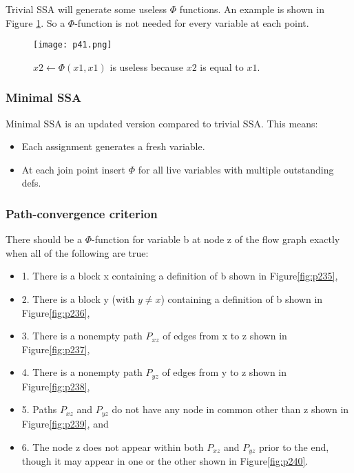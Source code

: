 Trivial SSA will generate some useless $\Phi$ functions. An example is shown in Figure \ref{fig:p41}. 
So a $\Phi$-function is not needed for every variable at each point.

\begin{figure}[H]
	\centering
	\texttt{[image: p41.png]}
	\caption{$x2 \leftarrow \Phi(x1,x1)$ is useless because $x2$ is equal to $x1$.}
	\label{fig:p41}

\end{figure}



\subsubsection{Minimal SSA}
Minimal SSA is an updated version compared to trivial SSA. This means:

\begin{itemize}
	\item Each assignment generates a fresh variable.
	\item At each join point insert $\Phi$ for all live variables with multiple outstanding defs.
\end{itemize}

\subsubsection{Path-convergence criterion}

There should be a $\Phi$-function for variable b at node z of the flow graph
exactly when all of the following are true:

\begin{itemize}
	\item 1. There is a block x containing a definition of b shown in Figure\ref{fig:p235},
	\item 2. There is a block y (with $y \neq x$) containing a definition of b shown in Figure\ref{fig:p236},
	\item 3. There is a nonempty path $P_{xz}$ of edges from x to z shown in Figure\ref{fig:p237},
	\item 4. There is a nonempty path $P_{yz}$ of edges from y to z shown in Figure\ref{fig:p238},
	\item 5. Paths $P_{xz}$ and $P_{yz}$ do not have any node in common other than z  shown in Figure\ref{fig:p239}, and
	\item 6. The node z does not appear within both $P_{xz}$ and $P_{yz}$ prior to the
	      end, though it may appear in one or the other shown in Figure\ref{fig:p240}.
\end{itemize}


